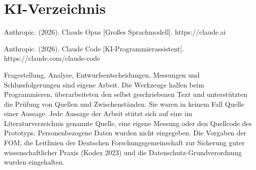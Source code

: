 \section*{KI-Verzeichnis}

Anthropic. (2026). Claude Opus [Großes Sprachmodell]. https://claude.ai

Anthropic. (2026). Claude Code [KI-Programmierassistent]. https://claude.com/claude-code

\medskip
\noindent Fragestellung, Analyse, Entwurfsentscheidungen, Messungen und Schlussfolgerungen sind eigene Arbeit. Die
Werkzeuge halfen beim Programmieren, überarbeiteten den selbst geschriebenen Text und unterstützten die Prüfung von Quellen und
Zwischenständen. Sie waren in keinem Fall Quelle einer Aussage. Jede Aussage der Arbeit stützt sich auf eine im
Literaturverzeichnis genannte Quelle, eine eigene Messung oder den Quellcode des Prototyps. Personenbezogene Daten
wurden nicht eingegeben. Die Vorgaben der FOM, die Leitlinien der Deutschen Forschungsgemeinschaft zur Sicherung guter
wissenschaftlicher Praxis (Kodex 2023) und die Datenschutz-Grundverordnung wurden eingehalten.

